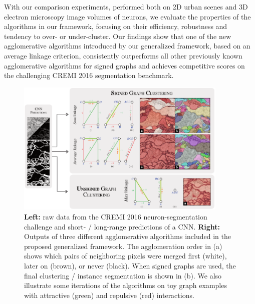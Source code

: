 With our comparison experiments, performed both on 2D urban scenes and 3D electron microscopy image volumes of neurons, we evaluate the properties of the algorithms in our framework, focusing on their efficiency, robustness and tendency to over- or under-cluster.
Our findings show that one of the new agglomerative algorithms introduced by our generalized framework, based on an average linkage criterion, consistently outperforms all other previously known agglomerative algorithms for signed graphs and achieves competitive scores on the challenging CREMI 2016 segmentation benchmark.



\begin{figure}[t]
\centering
\includegraphics[width=0.9\textwidth]{./figs/intro_image_v2.pdf} %
\caption{ \textbf{Left:} raw data from the CREMI 2016 neuron-segmentation challenge and short- / long-range predictions of a CNN. \textbf{Right:} Outputs of three different agglomerative algorithms included in the proposed generalized framework. The  agglomeration order in (a) shows which pairs of neighboring pixels were merged first (white), later on (brown), or never (black). When signed graphs are used, the final clustering / instance segmentation is shown in (b). We also illustrate some iterations of the algorithms on toy graph examples with attractive (green) and repulsive (red) interactions.
\label{fig:intro_figure}}
\end{figure}
